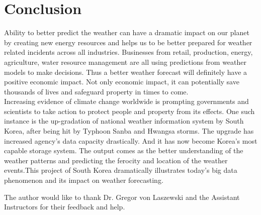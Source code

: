\documentclass[sigconf]{acmart}
\begin{document}
\section{Conclusion}


Ability to better predict the weather can have a dramatic impact on our planet by creating new energy resources and helps us to be better prepared for weather related incidents across all industries. Businesses from retail, production, energy, agriculture, water resource management are all using predictions from weather models to make decisions. Thus a better weather forecast will definitely have a positive economic impact. Not only economic impact, it can potentially save thousands of lives and safeguard property in times to come.\\

Increasing evidence of climate change worldwide is prompting governments and scientists to take action to protect people and property from its effects. One such instance is the up-gradation of national weather information system  by South Korea, after being hit by Typhoon Sanba and Hwangsa storms. The upgrade has increased agency's data capacity drastically. And it has now become Korea's most capable storage system. The output comes as the better understanding of the weather patterns and predicting the ferocity and location of the weather events.This project of South Korea dramatically illustrates today's big data phenomenon and its impact on weather forecasting.\\

\begin{acks}
The author would like to thank Dr. Gregor von Laszewski and the Assistant Instructors for their feedback and help.
\end{acks}




 
\end{document}
